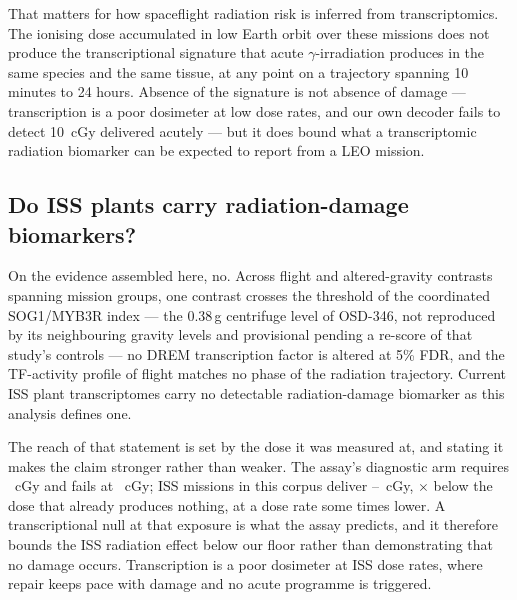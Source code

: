 That matters for how spaceflight radiation risk is inferred from transcriptomics. The
ionising dose accumulated in low Earth orbit over these missions does not produce the
transcriptional signature that acute $\gamma$-irradiation produces in the same species and
the same tissue, at any point on a trajectory spanning 10 minutes to 24 hours. Absence of
the signature is not absence of damage --- transcription is a poor dosimeter at low dose
rates, and our own decoder fails to detect 10~cGy delivered acutely --- but it does bound
what a transcriptomic radiation biomarker can be expected to report from a LEO mission.

\subsection*{Do ISS plants carry radiation-damage biomarkers?}

On the evidence assembled here, no. Across \NumFlightContrasts{} flight and
altered-gravity contrasts spanning \NumMissions{} mission groups, one contrast crosses the
threshold of the coordinated SOG1/MYB3R index --- the 0.38\,g centrifuge level of OSD-346,
not reproduced by its neighbouring gravity levels and provisional pending a re-score of
that study's controls --- no DREM transcription factor is altered at 5\% FDR, and the
TF-activity profile of flight matches no phase of the radiation trajectory. Current
ISS plant transcriptomes carry no detectable radiation-damage biomarker as this analysis
defines one.

The reach of that statement is set by the dose it was measured at, and stating it makes
the claim stronger rather than weaker. The assay's diagnostic arm requires
\DoseDetected{}~cGy and fails at \DoseNotDetected{}~cGy; ISS missions in this corpus
deliver \IssDoseLo{}--\IssDoseHi{}~cGy, \FoldBelowFloor{}$\times$ below the dose that
already produces nothing, at a dose rate some \DoseRateRatio{} times lower. A
transcriptional null at that exposure is what the assay predicts, and it therefore bounds
the ISS radiation effect below our floor rather than demonstrating that no damage occurs.
Transcription is a poor dosimeter at ISS dose rates, where repair keeps pace with damage
and no acute programme is triggered.

